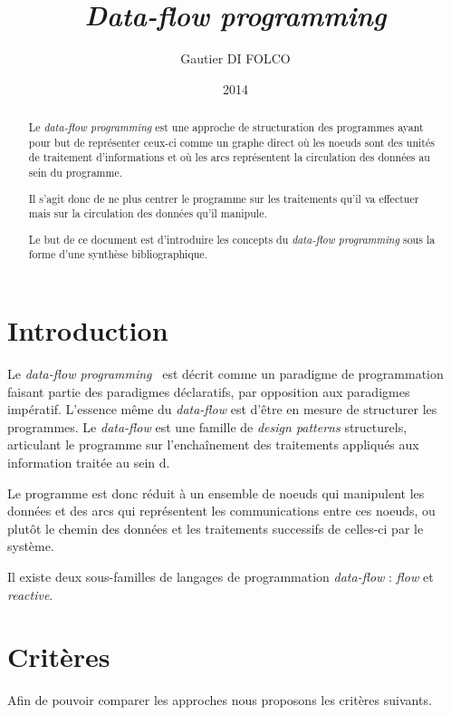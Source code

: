 \documentclass{article}
\title{\emph{Data-flow programming}}
\author{Gautier DI FOLCO}
\date{2014}
\begin{document}
\maketitle
\tableofcontents

\begin{abstract}
Le \emph{data-flow programming} est une approche de structuration des programmes
ayant pour but de représenter ceux-ci comme un graphe direct où les noeuds sont
des unités de traitement d'informations et où les arcs représentent la circulation
des données au sein du programme.

Il s'agit donc de ne plus centrer le programme sur les traitements qu'il va
effectuer mais sur la circulation des données qu'il manipule.

Le but de ce document est d'introduire les concepts du \emph{data-flow programming}
sous la forme d'une synthèse bibliographique.
\end{abstract}

\section{Introduction}\label{introduction}

Le \emph{data-flow programming}~\cite{dataflow} est décrit comme un paradigme de
programmation faisant partie des paradigmes déclaratifs, par opposition
aux paradigmes impératif.
L'essence même du \emph{data-flow} est d'être en mesure de structurer
les programmes.
Le \emph{data-flow} est une famille de \emph{design patterns} structurels,
articulant le programme sur l'enchaînement des
traitements appliqués aux information traitée au sein d.

Le programme est donc réduit à un ensemble de noeuds qui
manipulent les données et des arcs qui représentent les
communications entre ces noeuds, ou plutôt le chemin des
données et les traitements successifs de celles-ci par le système.

Il existe deux sous-familles de langages de programmation \emph{data-flow} :
\emph{flow} et \emph{reactive}. 

\section{Critères}\label{criteres}
Afin de pouvoir comparer les approches nous proposons les critères suivants.
\end{document}

